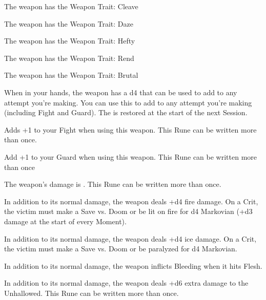 {The weapon has the Weapon Trait: Cleave


The weapon has the Weapon Trait: Daze


The weapon has the Weapon Trait: Hefty


The weapon has the Weapon Trait: Rend


The weapon has the Weapon Trait: Brutal


When in your hands, the weapon has a d4 \UD that can be used to add to any \RO attempt you're making. You can use this \UD to add to any \RO attempt you're making (including Fight and Guard).  The \UD is restored at the start of the next Session.





Adds +1 to your Fight \RO when using this weapon.  This Rune can be written more than once.



Add +1 to your Guard \RO when using this weapon.  This Rune can be written more than once



The weapon's damage is \DCUP.  This Rune can be written more than once.



In addition to its normal damage, the weapon deals +d4 fire damage.  On a Crit, the victim must make a Save vs. Doom or be lit on fire for d4 Markovian (+d3 damage at the start of every Moment).



In addition to its normal damage, the weapon deals +d4 ice damage.  On a Crit, the victim must make a Save vs. Doom or be paralyzed for d4 Markovian.



In addition to its normal damage, the weapon inflicts Bleeding when it hits Flesh.








In addition to its normal damage, the weapon deals +d6 extra damage to the Unhallowed.  This Rune can be written more than once.

}
